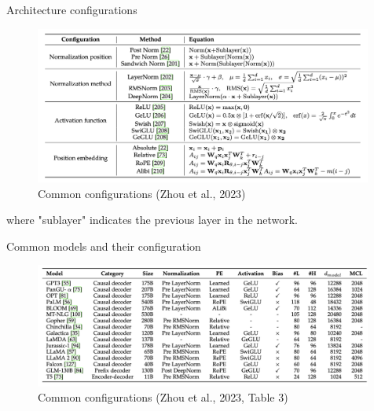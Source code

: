 \documentclass[10pt]{beamer}
\begin{document}
\begin{frame}{Architecture configurations}

\begin{figure}[h]
\centering
\includegraphics[width=0.99\textwidth]{fig/zhou_2023_tab4}
\caption{Common configurations (Zhou et al., 2023)}
\end{figure}
where "sublayer" indicates the previous layer in the network.

\end{frame}


\begin{frame}{Common models and their configuration}

\begin{figure}[h]
\centering
\includegraphics[width=0.99\textwidth]{fig/zhou_2023_tab3}
\caption{Common configurations (Zhou et al., 2023, Table 3)}
\end{figure}

\end{frame}
\end{document}
